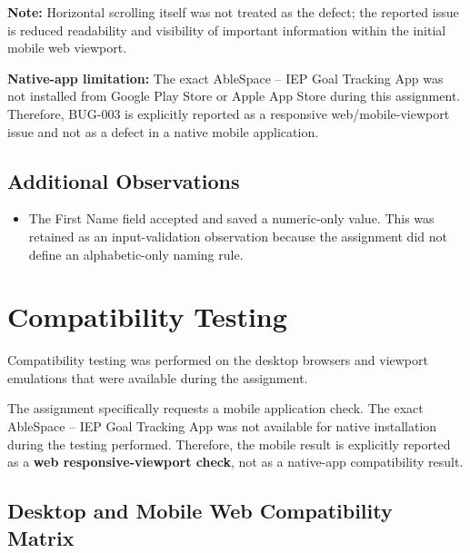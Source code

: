 \documentclass[11pt,a4paper]{article}
\begin{document}
\noindent
\textbf{Note:} Horizontal scrolling itself was not treated as the defect; the reported issue is reduced readability and visibility of important information within the initial mobile web viewport.

\noindent
\textbf{Native-app limitation:} The exact AbleSpace -- IEP Goal Tracking App was not installed from Google Play Store or Apple App Store during this assignment. Therefore, BUG-003 is explicitly reported as a responsive web/mobile-viewport issue and not as a defect in a native mobile application.

\subsection{Additional Observations}

\begin{itemize}
    \item The First Name field accepted and saved a numeric-only value. This was retained as an input-validation observation because the assignment did not define an alphabetic-only naming rule.
\end{itemize}


\section{Compatibility Testing}

Compatibility testing was performed on the desktop browsers and viewport emulations that were available during the assignment.

The assignment specifically requests a mobile application check. The exact AbleSpace -- IEP Goal Tracking App was not available for native installation during the testing performed. Therefore, the mobile result is explicitly reported as a \textbf{web responsive-viewport check}, not as a native-app compatibility result.

\subsection{Desktop and Mobile Web Compatibility Matrix}
\end{document}

